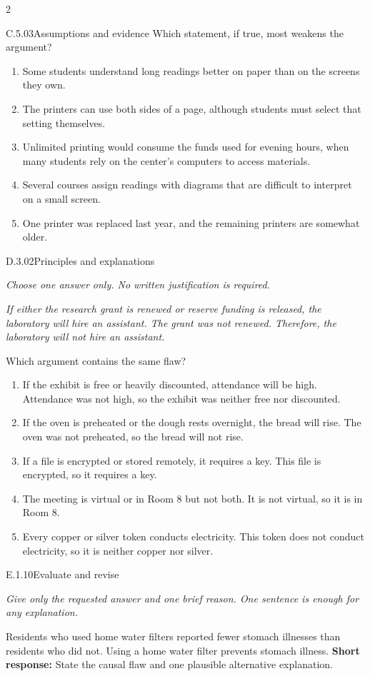 \documentclass[9pt]{extarticle}
\newcommand{\choice}[1]{\item #1}
\begin{document}
\begin{multicols}{2}
\begin{DenseCoreProblem}{C.5.03}{Assumptions and evidence}
Which statement, if true, most weakens the argument?
\begin{enumerate}[label=(\alph*)]
  \choice{Some students understand long readings better on paper than on the screens they own.}
  \choice{The printers can use both sides of a page, although students must select that setting themselves.}
  \choice{Unlimited printing would consume the funds used for evening hours, when many students rely on the center's computers to access materials.}
  \choice{Several courses assign readings with diagrams that are difficult to interpret on a small screen.}
  \choice{One printer was replaced last year, and the remaining printers are somewhat older.}
\end{enumerate}
\end{DenseCoreProblem}
\begin{DenseCoreProblem}{D.3.02}{Principles and explanations}
{\scriptsize\textit{Choose one answer only. No written justification is required.}\par}
\emph{If either the research grant is renewed or reserve funding is released, the laboratory will hire an assistant. The grant was not renewed. Therefore, the laboratory will not hire an assistant.}

Which argument contains the same flaw?
\begin{enumerate}[label=(\alph*)]
  \choice{If the exhibit is free or heavily discounted, attendance will be high. Attendance was not high, so the exhibit was neither free nor discounted.}
  \choice{If the oven is preheated or the dough rests overnight, the bread will rise. The oven was not preheated, so the bread will not rise.}
  \choice{If a file is encrypted or stored remotely, it requires a key. This file is encrypted, so it requires a key.}
  \choice{The meeting is virtual or in Room 8 but not both. It is not virtual, so it is in Room 8.}
  \choice{Every copper or silver token conducts electricity. This token does not conduct electricity, so it is neither copper nor silver.}
\end{enumerate}
\end{DenseCoreProblem}
\begin{DenseCoreProblem}{E.1.10}{Evaluate and revise}
{\scriptsize\textit{Give only the requested answer and one brief reason. One sentence is enough for any explanation.}\par}
Residents who used home water filters reported fewer stomach illnesses than residents who did not. Using a home water filter prevents stomach illness.
\textbf{Short response:} State the causal flaw and one plausible alternative explanation.
\end{DenseCoreProblem}
\end{multicols}
\end{document}
